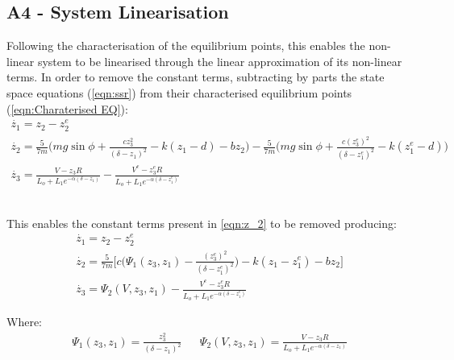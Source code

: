 \documentclass[a4paper,10pt,reqno]{amsart}
\numberwithin{equation}{section}
\begin{document}
\subsection{A4 - System Linearisation}\label{sec:A4}
\par Following the characterisation of the equilibrium points, this enables the non-linear system to be linearised through the linear approximation of its non-linear terms. In order to remove the constant terms, subtracting by parts the state space equations (\ref{eqn:ssr}) from their characterised equilibrium points (\ref{eqn:Charaterised EQ}):
\begin{subequations}
\begin{gather}
    \dot{z_1}=z_2-z_2^e
    \\
    \dot{z_2} = \frac{5}{7m}\bigg(mg\sin{\phi}+\frac{cz_3^2}{(\delta-z_1)^2}-k(z_1-d)-bz_2\bigg)-\frac{5}{7m}\bigg(mg\sin{\phi}+\frac{c(z_3^e)^2}{(\delta-z_1^e)^2}-k(z_1^e-d)\bigg)
    \label{eqn:z_2}\\
    \dot{z_3}=\frac{V-z_3R}{L_o+L_1e^{-\alpha(\delta-z_1)}}-\frac{V^e-z_3^eR}{L_o+L_1e^{-\alpha(\delta-z_1^e)}}
\end{gather}
\end{subequations}
\\
\par This enables the constant terms present in \ref{eqn:z_2} to be removed producing:
\begin{subequations}
\begin{gather}
    \dot{z_1}=z_2-z_2^e
    \\
    \dot{z_2} = \frac{5}{7m}\bigg[c\bigg(\Psi_1(z_3,z_1)-\frac{(z_3^e)^2}{(\delta-z_1^e)^2}\bigg)-k(z_1-z_1^e)-bz_2\bigg]
    \\
    \dot{z_3}=\Psi_2(V, z_3,z_1)-\frac{V^e-z_3^eR}{L_o+L_1e^{-\alpha(\delta-z_1^e)}}
\end{gather}
\end{subequations}

Where:
\begin{align*}
    \Psi_1(z_3,z_1) = \frac{z_3^2}{(\delta-z_1)^2} 
    && \Psi_2(V, z_3,z_1) = \frac{V-z_3R}{L_o+L_1e^{-\alpha(\delta-z_1)}}
\end{align*}
\end{document}

